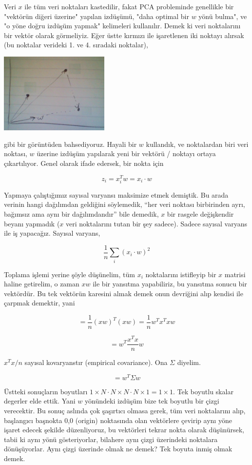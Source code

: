 \documentclass[12pt,fleqn]{article}\usepackage{../../common}
\begin{document}
Veri $x$ ile tüm veri noktaları kastedilir, fakat PCA probleminde
genellikle bir "vektörün diğeri üzerine" yapılan izdüşümü, "daha
optimal bir $w$ yönü bulma", ve "o yöne doğru izdüşüm yapmak"
kelimeleri kullanılır. Demek ki veri noktalarını bir vektör olarak
görmeliyiz. Eğer üstte kırmızı ile işaretlenen iki noktayı alırsak (bu
noktalar verideki 1. ve 4. sıradaki noktalar),

\includegraphics[height=4cm]{proj1.png}

gibi bir görüntüden bahsediyoruz. Hayali bir $w$ kullandık, ve noktalardan
biri veri noktası, $w$ üzerine izdüşüm yapılarak yeni bir vektörü / noktayı
ortaya çıkartılıyor. Genel olarak ifade edersek, bir nokta için

$$ z_i =  x_i^Tw = x_i \cdot w$$

Yapmaya çalıştığımız sayısal varyansı maksimize etmek demiştik. Bu arada verinin
hangi dağılımdan geldiğini söylemedik, ``her veri noktası birbirinden ayrı,
bağımsız ama aynı bir dağılımdandır'' bile demedik, $x$ bir rasgele değişkendir
beyanı yapmadık ($x$ veri noktalarını tutan bir şey sadece). Sadece sayısal
varyans ile iş yapacağız.  Sayısal varyans,

$$ \frac{1}{n}\sum_i  (x_i \cdot w)^2 $$

Toplama işlemi yerine şöyle düşünelim, tüm $x_i$ noktalarını istifleyip bir
$x$ matrisi haline getirelim, o zaman $xw$ ile bir yansıtma yapabiliriz, bu
yansıtma sonucu bir vektördür. Bu tek vektörün karesini almak demek onun
devriğini alıp kendisi ile çarpmak demektir, yani

$$ = \frac{1}{n}(xw)^T(xw) = \frac{1}{n} w^Tx^Txw$$

$$ =  w^T\frac{x^Tx}{n}w$$

$x^Tx / n$ sayısal kovaryanstır (empirical covariance). Ona $\Sigma$
diyelim. 

$$ =  w^T\Sigma w$$

Üstteki sonuçların boyutları $1 \times N \cdot N \times N \cdot N \times 1
= 1 \times 1$. Tek boyutlu skalar degerler elde ettik.  Yani $w$ yönündeki
izdüşüm bize tek boyutlu bir çizgi verecektir. Bu sonuç aslında çok
şaşırtıcı olmasa gerek, tüm veri noktalarını alıp, başlangıcı başnokta 0,0
(origin) noktasında olan vektörlere çevirip aynı yöne işaret edecek şekilde
düzenliyoruz, bu vektörleri tekrar nokta olarak düşünürsek, tabii ki aynı
yönü gösteriyorlar, bilahere aynı çizgi üzerindeki noktalara
dönüşüyorlar. Aynı çizgi üzerinde olmak ne demek? Tek boyuta inmiş olmak
demek.
\end{document}
